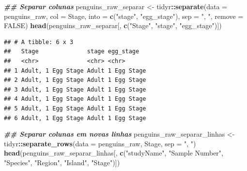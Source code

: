 \documentclass[
]{article}
\newenvironment{Shaded}{\begin{snugshade}}{\end{snugshade}}
\newcommand{\AttributeTok}[1]{\textcolor[rgb]{0.13,0.29,0.53}{#1}}
\newcommand{\ConstantTok}[1]{\textcolor[rgb]{0.56,0.35,0.01}{#1}}
\newcommand{\DocumentationTok}[1]{\textcolor[rgb]{0.56,0.35,0.01}{\textbf{\textit{#1}}}}
\newcommand{\FunctionTok}[1]{\textcolor[rgb]{0.13,0.29,0.53}{\textbf{#1}}}
\newcommand{\NormalTok}[1]{#1}
\newcommand{\OtherTok}[1]{\textcolor[rgb]{0.56,0.35,0.01}{#1}}
\newcommand{\SpecialCharTok}[1]{\textcolor[rgb]{0.81,0.36,0.00}{\textbf{#1}}}
\newcommand{\StringTok}[1]{\textcolor[rgb]{0.31,0.60,0.02}{#1}}
\begin{document}
\begin{Shaded}
\begin{Highlighting}[]
\DocumentationTok{\#\# Separar colunas}
\NormalTok{penguins\_raw\_separar }\OtherTok{\textless{}{-}}\NormalTok{ tidyr}\SpecialCharTok{::}\FunctionTok{separate}\NormalTok{(}\AttributeTok{data =}\NormalTok{ penguins\_raw, }
                                        \AttributeTok{col =}\NormalTok{ Stage,}
                                        \AttributeTok{into =} \FunctionTok{c}\NormalTok{(}\StringTok{"stage"}\NormalTok{, }\StringTok{"egg\_stage"}\NormalTok{), }
                                        \AttributeTok{sep =} \StringTok{", "}\NormalTok{,}
                                        \AttributeTok{remove =} \ConstantTok{FALSE}\NormalTok{)}
\FunctionTok{head}\NormalTok{(penguins\_raw\_separar[, }\FunctionTok{c}\NormalTok{(}\StringTok{"Stage"}\NormalTok{, }\StringTok{"stage"}\NormalTok{, }\StringTok{"egg\_stage"}\NormalTok{)])}
\end{Highlighting}
\end{Shaded}

\begin{verbatim}
## # A tibble: 6 x 3
##   Stage              stage egg_stage  
##   <chr>              <chr> <chr>      
## 1 Adult, 1 Egg Stage Adult 1 Egg Stage
## 2 Adult, 1 Egg Stage Adult 1 Egg Stage
## 3 Adult, 1 Egg Stage Adult 1 Egg Stage
## 4 Adult, 1 Egg Stage Adult 1 Egg Stage
## 5 Adult, 1 Egg Stage Adult 1 Egg Stage
## 6 Adult, 1 Egg Stage Adult 1 Egg Stage
\end{verbatim}

\begin{Shaded}
\begin{Highlighting}[]
\DocumentationTok{\#\# Separar colunas em novas linhas}
\NormalTok{penguins\_raw\_separar\_linhas }\OtherTok{\textless{}{-}}\NormalTok{ tidyr}\SpecialCharTok{::}\FunctionTok{separate\_rows}\NormalTok{(}\AttributeTok{data =}\NormalTok{ penguins\_raw,}
\NormalTok{                                                    Stage,}
                                                    \AttributeTok{sep =} \StringTok{", "}\NormalTok{)}
\FunctionTok{head}\NormalTok{(penguins\_raw\_separar\_linhas[, }\FunctionTok{c}\NormalTok{(}\StringTok{"studyName"}\NormalTok{, }\StringTok{"Sample Number"}\NormalTok{, }\StringTok{"Species"}\NormalTok{, }
                                     \StringTok{"Region"}\NormalTok{, }\StringTok{"Island"}\NormalTok{, }\StringTok{"Stage"}\NormalTok{)])}
\end{Highlighting}
\end{Shaded}
\end{document}
